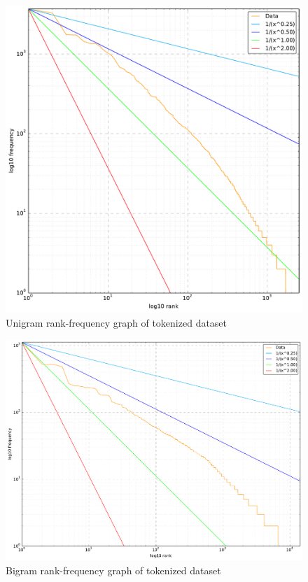\begin{figure}[hb]
	\centering
	\includegraphics[width=0.80\linewidth]{figures/frequency-graphs/1-gram}
	\caption{Unigram rank-frequency graph of tokenized dataset}
	\label{fig:rank-frequency-unigram}
\end{figure}

\begin{figure}[ht]
	\centering
	\includegraphics[width=0.9\linewidth]{figures/frequency-graphs/2-gram}
	\caption{Bigram rank-frequency graph of tokenized dataset}
	\label{fig:rank-frequency-bigram}
\end{figure}

